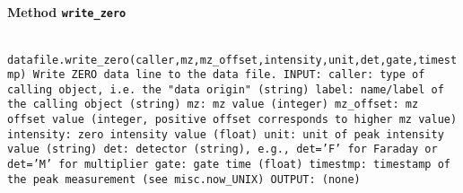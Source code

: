 \paragraph{Method \texttt{write_zero}}
\vspace{1ex}
\texttt{\newline
datafile.write_zero(caller,mz,mz_offset,intensity,unit,det,gate,timestmp)\newline
\newline
Write ZERO data line to the data file.\newline
\newline
INPUT:\newline
caller: type of calling object, i.e. the "data origin" (string)\newline
label: name/label of the calling object (string)\newline
mz: mz value (integer)\newline
mz_offset: mz offset value (integer, positive offset corresponds to higher mz value)\newline
intensity: zero intensity value (float)\newline
unit: unit of peak intensity value (string)\newline
det: detector (string), e.g., det='F' for Faraday or det='M' for multiplier\newline
gate: gate time (float)\newline
timestmp: timestamp of the peak measurement (see misc.now_UNIX)\newline
\newline
OUTPUT:\newline
(none)\newline
\newline
}

